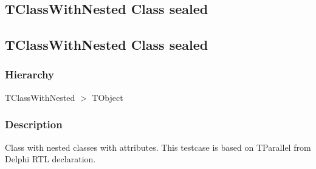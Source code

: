 \documentclass{report}
\begin{document}
\subsection*{\large{\textbf{TClassWithNested Class sealed}}\normalsize\hspace{1ex}\hrulefill}
\else
\subsection*{TClassWithNested Class sealed}
\fi
\label{ok_attributes.TClassWithNested}
\subsubsection*{\large{\textbf{Hierarchy}}\normalsize\hspace{1ex}\hfill}
TClassWithNested {$>$} TObject
\subsubsection*{\large{\textbf{Description}}\normalsize\hspace{1ex}\hfill}
Class with nested classes with attributes. This testcase is based on TParallel from Delphi RTL declaration.
\end{document}
